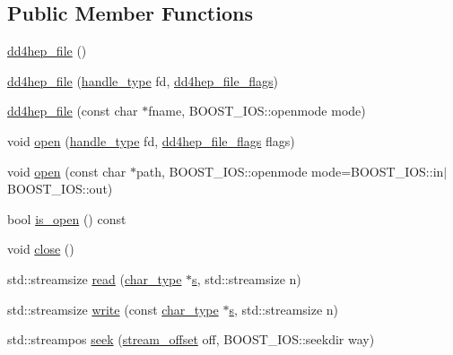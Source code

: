 \subsection*{Public Member Functions}
\begin{DoxyCompactItemize}
\item 
\hyperlink{class_d_d4hep_1_1dd4hep__file_ac14f4f89341ab662c41c0b1de784c458}{dd4hep\_\-file} ()
\item 
\hyperlink{class_d_d4hep_1_1dd4hep__file_a171ba6ea4aa627da95bfd8bb7d8aa7a2}{dd4hep\_\-file} (\hyperlink{class_t}{handle\_\-type} fd, \hyperlink{namespace_d_d4hep_a31d19f9b0ce567067d2897fbda1761e5}{dd4hep\_\-file\_\-flags})
\item 
\hyperlink{class_d_d4hep_1_1dd4hep__file_a7d25851ca4633fca12a3d23ec2eb4fe1}{dd4hep\_\-file} (const char $\ast$fname, BOOST\_\-IOS::openmode mode)
\item 
void \hyperlink{class_d_d4hep_1_1dd4hep__file_a5f7da6679da9dbc31f37c85e51d7dd94}{open} (\hyperlink{class_t}{handle\_\-type} fd, \hyperlink{namespace_d_d4hep_a31d19f9b0ce567067d2897fbda1761e5}{dd4hep\_\-file\_\-flags} flags)
\item 
void \hyperlink{class_d_d4hep_1_1dd4hep__file_a44e65364ed22ce152f237541e0391dcc}{open} (const char $\ast$path, BOOST\_\-IOS::openmode mode=BOOST\_\-IOS::in$|$BOOST\_\-IOS::out)
\item 
bool \hyperlink{class_d_d4hep_1_1dd4hep__file_a47a3a4df1f886d13b4611fe4bec459b9}{is\_\-open} () const 
\item 
void \hyperlink{class_d_d4hep_1_1dd4hep__file_afdabf56b0a0af86b2199e075ab1b2499}{close} ()
\item 
std::streamsize \hyperlink{class_d_d4hep_1_1dd4hep__file_a3becd552128a6306644b5ff9bd19c493}{read} (\hyperlink{class_d_d4hep_1_1dd4hep__file_aef4242f7f2fe15a59f7bf7a8f6ba24d5}{char\_\-type} $\ast$\hyperlink{_volumes_8cpp_a17ca6bfc8040d695d3cada22a4763d40}{s}, std::streamsize n)
\item 
std::streamsize \hyperlink{class_d_d4hep_1_1dd4hep__file_a33bb5fb24cdaf006ff9143d0d03f9bd3}{write} (const \hyperlink{class_d_d4hep_1_1dd4hep__file_aef4242f7f2fe15a59f7bf7a8f6ba24d5}{char\_\-type} $\ast$\hyperlink{_volumes_8cpp_a17ca6bfc8040d695d3cada22a4763d40}{s}, std::streamsize n)
\item 
std::streampos \hyperlink{class_d_d4hep_1_1dd4hep__file_a202c036e68f217e7a902819eb83ec2f3}{seek} (\hyperlink{class_d_d4hep_1_1dd4hep__file_a28e1531542193871075e8b7f47818113}{stream\_\-offset} off, BOOST\_\-IOS::seekdir way)
\item 

\end{DoxyCompactItemize}
